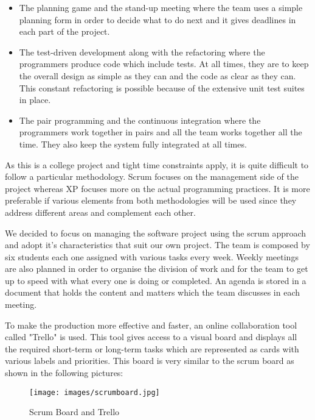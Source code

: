 \begin{itemize}
\item The planning game and the stand-up meeting where the team uses a simple planning form in order to decide what to do next and it gives deadlines in each part of the project. 
\item The test-driven development along with the refactoring where the programmers produce code which include tests. At all times, they are to keep the overall design as simple as they can and the code as clear as they can. This constant refactoring is possible because of the extensive unit test suites in place.
\item The pair programming and the continuous integration where the programmers work together in pairs and all the team works together all the time. They also keep the system fully integrated at all times. 
\end{itemize}

As this is a college project and tight time constraints apply, it is quite difficult to follow a particular methodology. Scrum focuses on the management side of the project whereas XP focuses more on the actual programming practices. It is more preferable if various elements from both methodologies will be used since they address different areas and complement each other.

We decided to focus on managing the software project using the scrum approach and adopt it's characteristics that suit our own project. The team is composed by six students each one assigned with various tasks every week. Weekly meetings are also planned in order to organise the division of work and for the team to get up to speed with what every one is doing or completed. An agenda is stored in a document that holds the content and matters which the team discusses in each meeting.

To make the production more effective and faster, an online collaboration tool called "Trello" is used. This tool gives access to a visual board and displays all the required short-term or long-term tasks which are represented as cards with various labels and priorities. This board is very similar to the scrum board as shown in the following pictures:

\begin{figure}[here]
\begin{minipage}{\textwidth}
\begin{center}
\texttt{[image: images/scrumboard.jpg]}
\end{center}
\caption[Caption for LOF]{Scrum Board and Trello\footnotemark}
\end{minipage} 
\end{figure}


